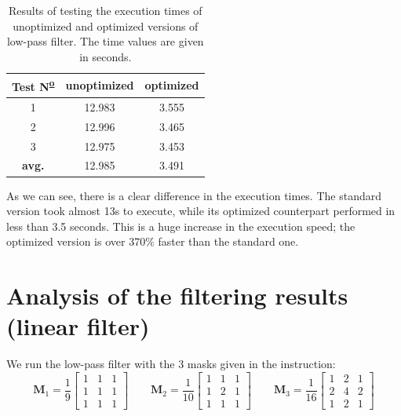 \documentclass[12pt]{article}
\begin{document}
\begin{table}[h]\centering
    \begin{tabular}{ccc}
        \toprule
        Test N\textsuperscript{\underline{o}} & unoptimized & optimized \\\midrule
        1                                     & 12.983      & 3.555     \\
        2                                     & 12.996      & 3.465     \\
        3                                     & 12.975      & 3.453     \\\midrule
        \bf avg.                              & 12.985      & 3.491     \\
        \bottomrule
    \end{tabular}
    \caption{Results of testing the execution times of unoptimized and optimized versions of low-pass filter.
        The time values are given in seconds.}
    \label{tab:lowpass-execution-time}
\end{table}

As we can see, there is a clear difference in the execution times.
The standard version took almost 13s to execute, while its optimized counterpart performed in less than 3.5 seconds.
This is a huge increase in the execution speed; the optimized version is over 370\% faster than the standard one.

\section{Analysis of the filtering results (linear filter)}

We run the low-pass filter with the 3 masks given in the instruction:
\begin{equation*}
    \mathbf{M}_1 = \frac{1}{9}\begin{bmatrix}
        1 & 1 & 1 \\
        1 & 1 & 1 \\
        1 & 1 & 1
    \end{bmatrix}
    \qquad
    \mathbf{M}_2 = \frac{1}{10}\begin{bmatrix}
        1 & 1 & 1 \\
        1 & 2 & 1 \\
        1 & 1 & 1
    \end{bmatrix}
    \qquad
    \mathbf{M}_3 = \frac{1}{16}\begin{bmatrix}
        1 & 2 & 1 \\
        2 & 4 & 2 \\
        1 & 2 & 1
    \end{bmatrix}
\end{equation*}
\end{document}
